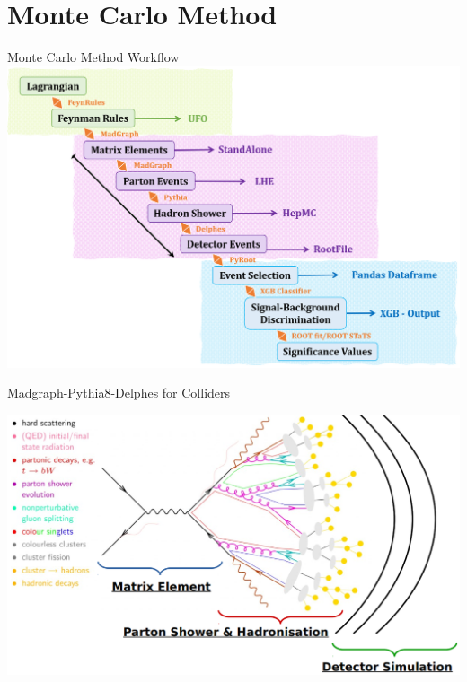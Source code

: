 \documentclass{../../bredelebeamer}
\begin{document}
\section{Monte Carlo Method}
\begin{frame}{Monte Carlo Method Workflow}
	\includegraphics[width=1.0\linewidth]{../Images/Workflow.png}
\end{frame}

\begin{frame}{Madgraph-Pythia8-Delphes for Colliders}
	\begin{center}
		\includegraphics[width=.99\linewidth]{../Images/Madgraph.png}
	\end{center}
\end{frame}
\end{document}
